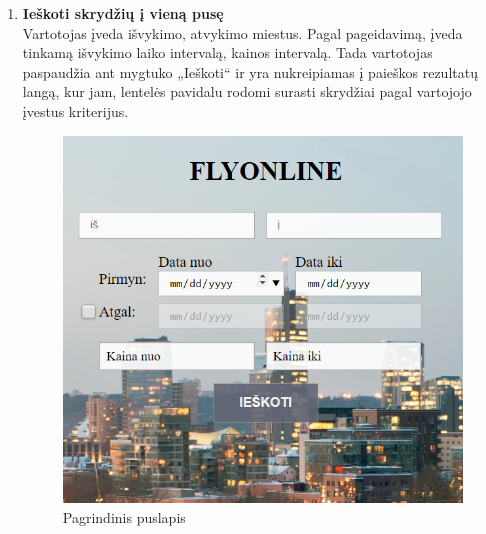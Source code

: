 \documentclass{VUMIFPSkursinis}
\begin{document}
                \begin{enumerate}[label=\textbf{U\arabic*}.]

                    \item \textbf{Ieškoti skrydžių į vieną pusę}\\
                    Vartotojas įveda išvykimo, atvykimo miestus. Pagal pageidavimą, įveda tinkamą išvykimo laiko intervalą, kainos intervalą. Tada vartotojas paspaudžia ant mygtuko „Ieškoti“ ir yra nukreipiamas į paieškos rezultatų langą, kur jam, lentelės pavidalu rodomi surasti skrydžiai pagal vartojojo įvestus kriterijus.
                    \begin{figure}[H]
                        \centering
                        \includegraphics[scale=0.8]{img/oneway}
                        \caption{Pagrindinis puslapis}
                        \label{Pagrindinis puslapis}
                    \end{figure}
    

\end{enumerate}
\end{document}
